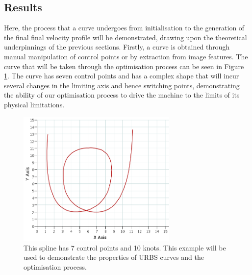 \subsection{Results}
Here, the process that a curve undergoes from initialisation to the generation of the final final velocity profile will be demonstrated, drawing upon the theoretical underpinnings of the previous sections.
Firstly, a curve is obtained through manual manipulation of control points or by extraction from image features. The curve that will be taken through the optimisation process can be seen in Figure \ref{fig:example}. The curve has seven control points and has a complex shape that will incur several changes in the limiting axis and hence switching points, demonstrating the ability of our optimisation process to drive the machine to the limits of its physical limitations.

\begin{figure}[htbp]  
\includegraphics[width=0.7\textwidth]{figures/optimisation/exampleSpline.png}
\caption[Optimisation example curve]{ This spline has 7 control points and 10 knots. This example will be used to demonstrate the properties of URBS curves and the optimisation process.
\label{fig:example}}
\end{figure}

